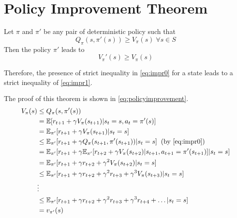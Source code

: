\section{Policy Improvement Theorem} \label{policyimprovement}



Let $\pi$ and $\pi'$ be any pair of deterministic policy such that 
\begin{equation} \label{eq:impr0}
	Q_\pi(s, \pi'(s)) \ge V_\pi(s) \; \forall s \in S
\end{equation}
Then the policy $\pi'$ leads to
\begin{equation} \label{eq:impr1}
V_\pi'(s) \ge V_\pi(s)
\end{equation}


Therefore, the presence of strict inequality in \vref{eq:impr0} for a state leads to a strict inequality of \vref{eq:impr1}.

The proof of this theorem is shown in \vref{eq:policyimprovement}.
\begin{align}\label{eq:policyimprovement}
\begin{split}
V_\pi(s) &\le Q_\pi(s, \pi'(s))\\
		&= \mathbb{E}[r_{t+1} + \gamma V_\pi(s_{t+1})| s_t = s, a_t = \pi'(s)]\\
		&= \mathbb{E}_{\pi'}[r_{t+1} + \gamma V_\pi(s_{t+1})| s_t = s]\\
		&\le \mathbb{E}_{\pi'}[r_{t+1} + \gamma Q_\pi(s_{t+1}, \pi'(s_{t+1}))| s_t = s] \; \; \text{(by \ref{eq:impr0})}\\
		&= \mathbb{E}_{\pi'}[r_{t+1} + \gamma \mathbb{E}_{\pi'}[r_{t+2}+ \gamma V_\pi(s_{t+2})| s_{t+1}, a_{t+1} = \pi'(s_{t+1})]| s_t = s]\\
		&= \mathbb{E}_{\pi'}[r_{t+1} + \gamma r_{t+2} + \gamma^2 V_\pi(s_{t+2})| s_t = s]\\
		&\le \mathbb{E}_{\pi'}[r_{t+1} + \gamma r_{t+2} + \gamma^2 r_{t+3} + \gamma^3 V_\pi(s_{t+3})| s_t = s]\\
		&\vdots\\
		&\le \mathbb{E}_{\pi'}[r_{t+1} + \gamma r_{t+2} + \gamma^2 r_{t+3} + \gamma^3 r_{t+4} + \dots| s_t = s]\\
		&= v_{\pi'}(s)
\end{split}
\end{align}


